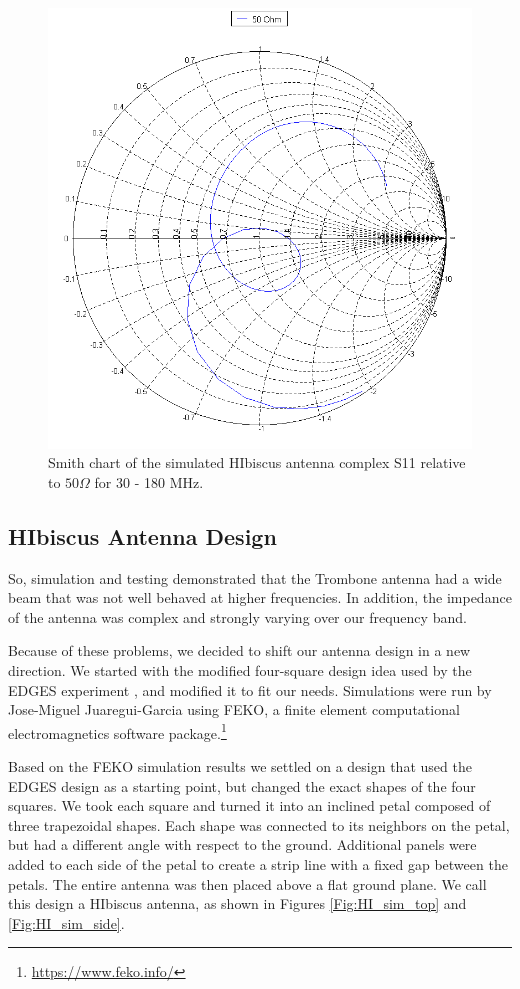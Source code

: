 \begin{figure}[htb]
\begin{minipage}[b]{0.46\textwidth}
\includegraphics[width=0.95\linewidth]{SCIHI_system/figures/HIbiscus_S11_50_Smith.png}
\caption{Smith chart of the simulated HIbiscus antenna complex S11 relative to $50 \Omega$ for 30 - 180 MHz.}
\label{Fig:HIsim_S11_Smith}
\end{minipage}
\end{figure}

\subsection{HIbiscus Antenna Design}
So, simulation and testing demonstrated that the Trombone antenna had a wide beam that was not well behaved at higher frequencies. In addition, the impedance of the antenna was complex and strongly varying over our frequency band. 

Because of these problems, we decided to shift our antenna design in a new direction. We started with the modified four-square design idea used by the EDGES experiment \cite{bowman_2008}\cite{rogers_2008}, and modified it to fit our needs. Simulations were run by Jose-Miguel Juaregui-Garcia using FEKO, a finite element computational electromagnetics software package.\footnote{\url{https://www.feko.info/}} 

Based on the FEKO simulation results we settled on a design that used the EDGES design as a starting point, but changed the exact shapes of the four squares. We took each square and turned it into an inclined petal composed of three trapezoidal shapes. Each shape was connected to its neighbors on the petal, but had a different angle with respect to the ground. Additional panels were added to each side of the petal to create a strip line with a fixed gap between the petals. The entire antenna was then placed above a flat ground plane. We call this design a HIbiscus antenna, as shown in Figures \ref{Fig:HI_sim_top} and \ref{Fig:HI_sim_side}. 

